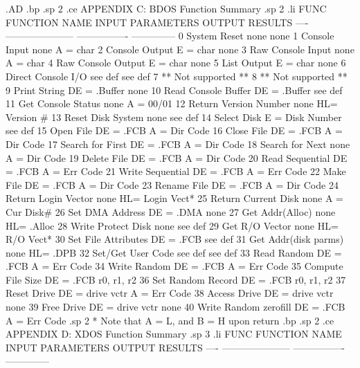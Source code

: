 .AD
.bp
.sp 2
.ce
APPENDIX C:  BDOS Function Summary
.sp 2
.li
FUNC FUNCTION NAME         INPUT PARAMETERS  OUTPUT RESULTS
---- --------------------- ----------------  --------------
 0   System Reset          none              none
 1   Console Input         none              A = char
 2   Console Output        E = char          none
 3   Raw Console Input     none              A = char
 4   Raw Console Output    E = char          none
 5   List Output           E = char          none
 6   Direct Console I/O    see def           see def
 7   ** Not supported **
 8   ** Not supported **
 9   Print String          DE = .Buffer      none
10   Read Console Buffer   DE = .Buffer      see def
11   Get Console Status    none              A = 00/01
12   Return Version Number none              HL= Version #
13   Reset Disk System     none              see def
14   Select Disk           E = Disk Number   see def
15   Open File             DE = .FCB         A = Dir Code
16   Close File            DE = .FCB         A = Dir Code
17   Search for First      DE = .FCB         A = Dir Code
18   Search for Next       none              A = Dir Code
19   Delete File           DE = .FCB         A = Dir Code
20   Read Sequential       DE = .FCB         A = Err Code
21   Write Sequential      DE = .FCB         A = Err Code
22   Make File             DE = .FCB         A = Dir Code
23   Rename File           DE = .FCB         A = Dir Code
24   Return Login Vector   none              HL= Login Vect*
25   Return Current Disk   none              A = Cur Disk#
26   Set DMA Address       DE = .DMA         none
27   Get Addr(Alloc)       none              HL= .Alloc
28   Write Protect Disk    none              see def
29   Get R/O Vector        none              HL= R/O Vect*
30   Set File Attributes   DE = .FCB         see def
31   Get Addr(disk parms)  none              HL= .DPB
32   Set/Get User Code     see def           see def
33   Read Random           DE = .FCB         A = Err Code
34   Write Random          DE = .FCB         A = Err Code
35   Compute File Size     DE = .FCB         r0, r1, r2
36   Set Random Record     DE = .FCB         r0, r1, r2
37   Reset Drive           DE = drive vctr   A = Err Code
38   Access Drive          DE = drive vctr   none
39   Free Drive            DE = drive vctr   none
40   Write Random zerofill DE = .FCB         A = Err Code
.sp 2
* Note that A = L, and B = H upon return
.bp
.sp 2
.ce
APPENDIX D:  XDOS Function Summary
.sp 3
.li
FUNC FUNCTION NAME         INPUT PARAMETERS  OUTPUT RESULTS
---- --------------------- ----------------  --------------
